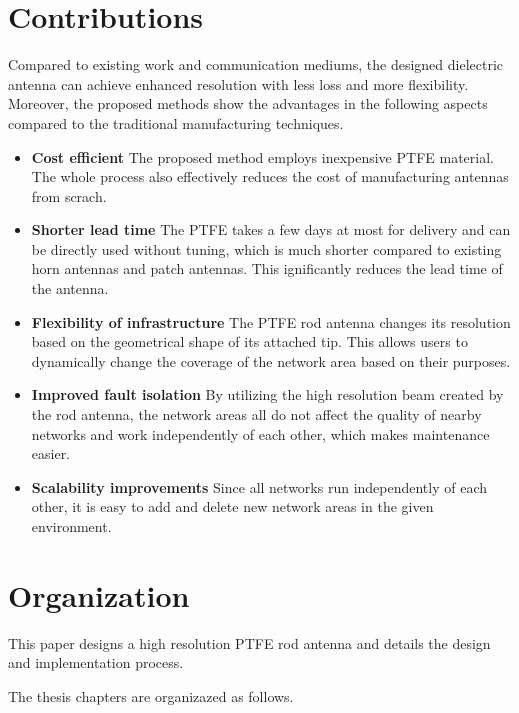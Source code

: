 \documentclass[a4paper,12pt]{report}
\begin{document}
\section{Contributions}

Compared to existing work and communication mediums,
the designed dielectric antenna can achieve
enhanced resolution with less loss and more flexibility.
Moreover, the proposed methods
show the advantages in the following aspects compared to the traditional
manufacturing techniques.

\begin{itemize}
  \item[] \textbf{Cost efficient}
  The proposed method employs inexpensive PTFE material.
  The whole process also effectively reduces the cost of
  manufacturing antennas from scrach.
  \item[] \textbf{Shorter lead time}
  The PTFE takes a few days at most for delivery and can be directly used without tuning,
  which is much shorter compared to existing horn antennas and patch antennas.
  This ignificantly reduces the lead time of the antenna.
  \item[] \textbf{Flexibility of infrastructure}
  The PTFE rod antenna changes its resolution based
  on the geometrical shape of its attached tip.
  This allows users to dynamically change
  the coverage of the network area based on their purposes.
  \item[] \textbf{Improved fault isolation}
  By utilizing the high resolution beam created by the rod antenna,
  the network areas all do not affect the quality of nearby networks and
  work independently of each other,
  which makes maintenance easier.
  \item[] \textbf{Scalability improvements}
  Since all networks run independently of each other,
  it is easy to add and delete new network areas in the given environment.
\end{itemize}

\section{Organization}

This paper designs a high resolution PTFE rod antenna
and details the design and implementation process.

The thesis chapters are organizazed as follows.
\end{document}
